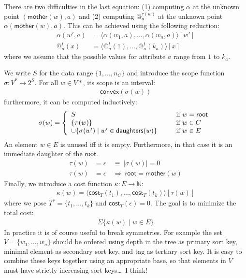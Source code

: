 \documentclass{article}
\makeatletter
\newcommand{\NAT}{{\mathbb N}}
\newcommand{\SET}[1]{{\{{#1}\}}}
\newcommand{\COST}{{\textsf{cost}}}
\newcommand{\TO}{\rightarrow}
\newcommand{\ROOT}{{\textsf{root}}}
\newcommand{\MOTHER}{{\textsf{mother}}}
\newcommand{\DAUGHTERS}{{\textsf{daughters}}}
\newcommand{\UNION}{\cup}
\newcommand{\TUP}[1]{{\langle{#1}\rangle}}
\newcommand{\EPS}{\epsilon}
\newcommand{\AT}[2]{@^{#1}_{#2}}
\newcommand{\CONVEX}{{\textsf{convex}}}
\newcommand{\IMPLIES}{\Rightarrow}
\makeatother
\begin{document}
There are two difficulties in the last equation: (1) computing
$\alpha$ at the unknown point $(\MOTHER(w),a)$ and (2) computing
$\AT{\tau(w)}{a}$ at the unknown point $\alpha(\MOTHER(w),a)$.  This
can be achieved using the following reduction:
\begin{align*}
\alpha(w',a) &= \TUP{\alpha(w_1,a),\ldots,\alpha(w_n,a)}[w']\\
\AT{t}{a}(x) &= \TUP{\AT{t}{a}(1),\ldots,\AT{t}{a}(k_a)}[x]
\end{align*}
where we assume that the possible values for attribute $a$ range from
$1$ to $k_a$.

We write $S$ for the data range $\SET{1,\ldots,n_C}$ and introduce the
scope function $\sigma:V^*\TO 2^S$.  For all $w\in V*$, its scope is
an interval:
\begin{gather*}
\CONVEX(\sigma(w))
\end{gather*}
furthermore, it can be computed inductively:
\begin{gather*}
\sigma(w) = \left\{
\begin{array}{l@{\hspace{1cm}}l}
S & \text{if } w=\ROOT\\
\SET{\pi(w)} & \text{if } w\in C\\
{\UNION}\SET{\sigma(w')\mid w'\in\DAUGHTERS(w)} & \text{if } w\in E
\end{array}
\right.
\end{gather*}
An element $w\in E$ is unused iff it is empty.  Furthermore, in that
case it is an immediate daughter of the $\ROOT$.
\begin{align*}
\tau(w)&=\EPS\ &\equiv\ |\sigma(w)|=0\\
\tau(w)&=\EPS\ &\IMPLIES\ \ROOT=\MOTHER(w)
\end{align*}
Finally, we introduce a cost function $\kappa:E\TO\NAT$:
\begin{gather*}
\kappa(w) = \TUP{\COST_T(t_1),\ldots,\COST_T(t_k)}[\tau(w)]
\end{gather*}
where we pose $T^*=\SET{t_1,\ldots,t_k}$ and $\COST_T(\EPS)=0$.
The goal is to minimize the total cost:
\begin{gather*}
{\Sigma}\SET{\kappa(w)\mid w\in E}
\end{gather*}
In practice it is of course useful to break symmetries.  For example
the set $V=\SET{w_1,\ldots,w_n}$ should be ordered using depth in the
tree as primary sort key, minimal element as secondary sort key, and
tag as tertiary sort key.  It is easy to combine these keys together
using an appropriate base, so that elements in $V$ must have strictly
increasing sort keys\ldots\ I think!
\end{document}
